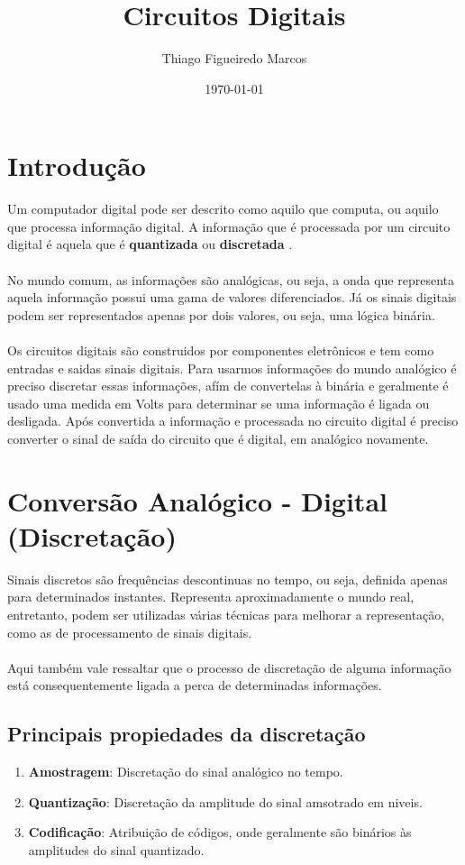 \documentclass[12pt, onecolumn]{article}
\title{Circuitos Digitais}
\author{Thiago Figueiredo Marcos}
\date{\today}
\begin{document}
	
	\maketitle

	\section{Introdução}
	Um computador digital pode ser descrito como aquilo que computa, ou aquilo 
	que processa informação digital. A informação que é processada por um circuito 
	digital é aquela que é \textbf{quantizada} ou \textbf{discretada} \citep{art1}.\\
	\\
	No mundo comum, as informações são analógicas, ou seja, a onda que representa 
	aquela informação possui uma gama de valores diferenciados. Já os sinais digitais
	podem ser representados apenas por dois valores, ou seja, uma lógica binária.\citep{bk1}\\ 
	\\
	Os circuitos digitais são construidos por componentes eletrônicos e tem como
	entradas e saidas sinais digitais. Para usarmos informações do mundo analógico
	é preciso discretar essas informações, afím de convertelas à binária e geralmente é
	usado uma medida em Volts para determinar se uma informação é ligada ou desligada. 
	Após convertida a informação e processada no circuito digital é preciso converter
	o sinal de saída do circuito que é digital, em analógico novamente.\citep{art2}

	\section{Conversão Analógico - Digital (Discretação)}
	Sinais discretos são frequências descontinuas no tempo, ou seja, definida apenas
	para determinados instantes. Representa aproximadamente o mundo real, entretanto,
	podem ser utilizadas várias técnicas para melhorar a representação, como as de 
	processamento de sinais digitais.\\
	\\
	Aqui também vale ressaltar que o processo de discretação de alguma informação
	está consequentemente ligada a perca de determinadas informações.
		
		\subsection{Principais propiedades da discretação}
		\begin{enumerate}
			\item\textbf{Amostragem}: Discretação do sinal analógico no tempo.
			\item\textbf{Quantização}: Discretação da amplitude do sinal amsotrado 
				em niveis.
			\item\textbf{Codificação}: Atribuição de códigos, onde geralmente 
				são binários às	amplitudes do sinal quantizado.
		\end{enumerate}
\end{document}
